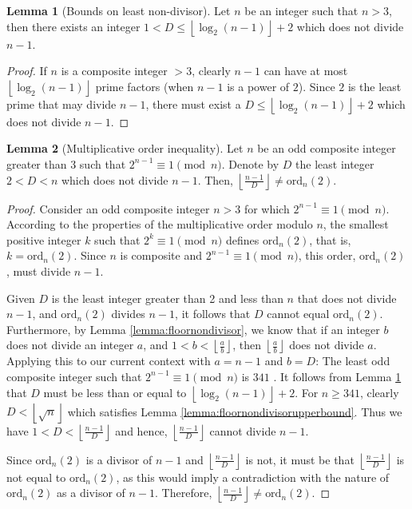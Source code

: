 \documentclass{article}
\theoremstyle{plain}
\theoremstyle{definition}
\newtheorem{lemma}{Lemma}
\newcommand{\ordn}[1]{\text{ord}_n\left({#1}\right)}
\begin{document}
\begin{lemma}[Bounds on least non-divisor] \label{lemma:leastnondivisor}
Let $n$ be an integer such that $n > 3$, then there exists an integer $1 < D \leq \left\lfloor\log_2(n-1)\right\rfloor + 2$ which does not divide $n-1$.
\end{lemma}
\begin{proof}
If $n$ is a composite integer $> 3$, clearly $n-1$ can have at most $\left\lfloor\log_2(n-1)\right\rfloor$ prime factors (when $n-1$ is a power of $2$). Since $2$ is the least prime that may divide $n-1$, there must exist a $D \leq \left\lfloor\log_2(n-1)\right\rfloor + 2$ which does not divide $n-1$.
\end{proof}

\begin{lemma}[Multiplicative order inequality] \label{lemma:orderinequality}
Let \( n \) be an odd composite integer greater than 3 such that \( 2^{n-1} \equiv 1 \pmod{n} \). Denote by \( D \) the least integer \(2 < D < n \) which does not divide \( n-1 \). Then, \( \left\lfloor\frac{n-1}{D}\right\rfloor \not= \ordn{2} \).
\end{lemma}
\begin{proof}
Consider an odd composite integer \( n > 3 \) for which \( 2^{n-1} \equiv 1 \pmod{n} \). According to the properties of the multiplicative order modulo $n$, the smallest positive integer \( k \) such that \( 2^k \equiv 1 \pmod{n} \) defines \( \ordn{2} \), that is, \( k = \ordn{2} \). Since $n$ is composite and \( 2^{n-1} \equiv 1 \pmod{n} \), this order, \( \ordn{2} \), must divide \( n-1 \).

Given \( D \) is the least integer greater than 2 and less than \( n \) that does not divide \( n-1 \), and \( \ordn{2} \) divides \( n-1 \), it follows that \( D \) cannot equal \( \ordn{2} \). Furthermore, by Lemma \ref{lemma:floornondivisor}, we know that if an integer \( b \) does not divide an integer \( a \), and \( 1 < b < \left\lfloor \frac{a}{b} \right\rfloor \), then \( \left\lfloor \frac{a}{b} \right\rfloor \) does not divide \( a \). Applying this to our current context with \( a = n-1 \) and \( b = D \): The least odd composite integer such that \( 2^{n-1} \equiv 1 \pmod{n} \) is $341$ \cite{oeisfermatpspbase2}. It follows from Lemma \ref{lemma:leastnondivisor} that $D$ must be less than or equal to $\left\lfloor\log_2(n-1)\right\rfloor + 2$. For $n \geq 341$, clearly $D < \left\lfloor\sqrt{n}\right\rfloor$ which satisfies Lemma \ref{lemma:floornondivisorupperbound}. Thus we have \( 1 < D < \left\lfloor \frac{n-1}{D} \right\rfloor \) and hence, \( \left\lfloor \frac{n-1}{D} \right\rfloor \) cannot divide \( n-1 \).

Since \( \ordn{2} \) is a divisor of \( n-1 \) and \( \left\lfloor \frac{n-1}{D} \right\rfloor \) is not, it must be that \( \left\lfloor \frac{n-1}{D} \right\rfloor \) is not equal to \( \ordn{2} \), as this would imply a contradiction with the nature of \( \ordn{2} \) as a divisor of \( n-1 \). Therefore, \( \left\lfloor\frac{n-1}{D}\right\rfloor \not= \ordn{2} \).
\end{proof}
\end{document}
